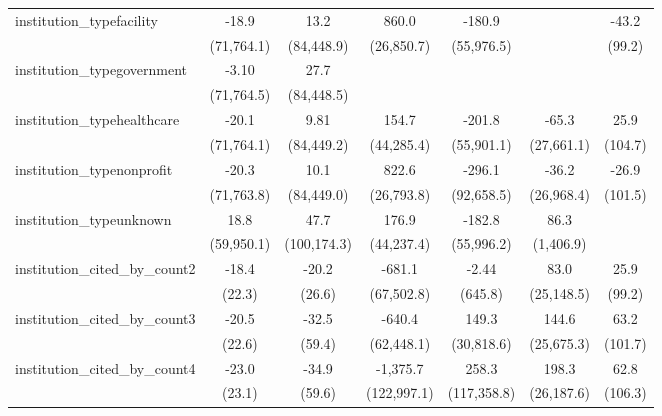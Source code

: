 \begin{tabular}{lcccccc}
   institution\_typefacility             & -18.9        & 13.2         & 860.0        & -180.9        &            & -43.2\\   
                                         & (71,764.1)   & (84,448.9)   & (26,850.7)   & (55,976.5)    &            & (99.2)\\   
   institution\_typegovernment           & -3.10        & 27.7         &              &               &            &   \\   
                                         & (71,764.5)   & (84,448.5)   &              &               &            &   \\   
   institution\_typehealthcare           & -20.1        & 9.81         & 154.7        & -201.8        & -65.3      & 25.9\\   
                                         & (71,764.1)   & (84,449.2)   & (44,285.4)   & (55,901.1)    & (27,661.1) & (104.7)\\   
   institution\_typenonprofit            & -20.3        & 10.1         & 822.6        & -296.1        & -36.2      & -26.9\\   
                                         & (71,763.8)   & (84,449.0)   & (26,793.8)   & (92,658.5)    & (26,968.4) & (101.5)\\   
   institution\_typeunknown              & 18.8         & 47.7         & 176.9        & -182.8        & 86.3       &   \\   
                                         & (59,950.1)   & (100,174.3)  & (44,237.4)   & (55,996.2)    & (1,406.9)  &   \\   
   institution\_cited\_by\_count2        & -18.4        & -20.2        & -681.1       & -2.44         & 83.0       & 25.9\\   
                                         & (22.3)       & (26.6)       & (67,502.8)   & (645.8)       & (25,148.5) & (99.2)\\   
   institution\_cited\_by\_count3        & -20.5        & -32.5        & -640.4       & 149.3         & 144.6      & 63.2\\   
                                         & (22.6)       & (59.4)       & (62,448.1)   & (30,818.6)    & (25,675.3) & (101.7)\\   
   institution\_cited\_by\_count4        & -23.0        & -34.9        & -1,375.7     & 258.3         & 198.3      & 62.8\\   
                                         & (23.1)       & (59.6)       & (122,997.1)  & (117,358.8)   & (26,187.6) & (106.3)\\   

\end{tabular}
